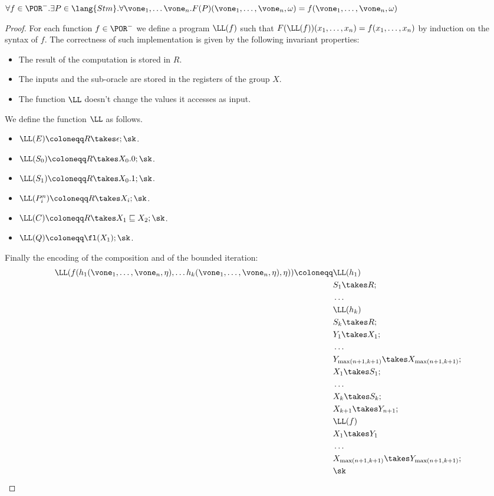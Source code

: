 \begin{lemma}
\label{lemma:portosifp}
$\forall f \in \POR^-.\exists P\in \lang {Stm}.\\\forall \vone_1, \ldots \vone_n. F(P)(\vone_1, \ldots, \vone_n, \omega)=f(\vone_1, \ldots, \vone_n, \omega)$
\end{lemma}
\begin{proof}
For each function $f \in \POR^-$ we define a program $\LL(f)$ such that $F(\LL(f))(x_1, \ldots, x_n)=f(x_1, \ldots, x_n)$ by induction on the syntax of $f$. The correctness of such implementation is given by the following invariant properties:
\begin{itemize}
\item The result of the computation is stored in $R$.
\item The inputs and the sub-oracle are stored in the registers of the group $X$.
\item The function $\LL$ doesn't change the values it accesses as input.
\end{itemize}

We define the function $\LL$ as follows.
\begin{itemize}
\item $\LL(E)\coloneqq R \takes \epsilon; \sk$.
\item $\LL(S_0)\coloneqq R \takes X_0.0; \sk$.
\item $\LL(S_1)\coloneqq R \takes X_0.1; \sk$.
\item $\LL({P}^n_i)\coloneqq R \takes X_i; \sk$.
\item $\LL(C)\coloneqq R \takes X_1 \sqsubseteq X_2; \sk$.
\item $\LL(Q)\coloneqq \fl(X_1); \sk$.
\end{itemize}

Finally the encoding of the composition and of the bounded iteration:
\begin{align*}
\LL(f(h_1(\vone_1,\ldots, \vone_n, \eta), \ldots h_k(\vone_1,\ldots, \vone_n, \eta), \eta))\coloneqq& \LL(h_1)\\
&S_1 \takes R;\\
&\ldots\\
&\LL(h_k)\\
&S_k \takes R;\\
&Y_1 \takes X_1;\\
& \ldots\\
& Y_{\max(n+1, k+1)} \takes X_{\max(n+1, k+1)};\\
& X_1 \takes S_1;\\
& \ldots\\
& X_k \takes S_k;\\
& X_{k+1} \takes Y_{n+1};\\
&\LL(f)\\
& X_1 \takes Y_1\\
&\ldots\\
&X_{\max(n+1, k+1)} \takes Y_{\max(n+1, k+1)};\\
&\sk
\end{align*}


\end{proof}
